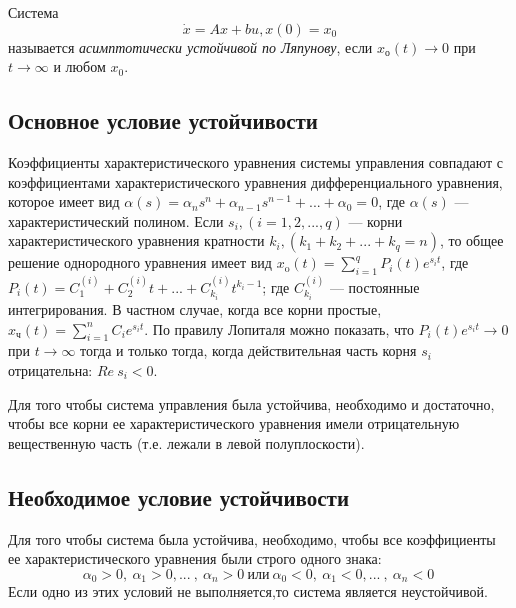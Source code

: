 \documentclass[../../TAU.tex]{subfiles}
\begin{document}
    Система 
    \begin{equation}\label{LIN_DS_3_1}
        \dot x = Ax + bu, x(0) = x_0
    \end{equation} 
    называется 
    {\it асимптотически устойчивой по Ляпунову}, если 
    $x_\text{о}(t)\rightarrow0$ 
    при 
    $t\rightarrow\infty$ 
    и любом $x_0$.\par

\subsection{Основное условие устойчивости}

    Коэффициенты характеристического уравнения системы управления совпадают с коэффициентами характеристического уравнения дифференциального уравнения, которое имеет вид
    $\alpha(s)=\alpha_ns^n+\alpha_{n-1}s^{n-1}+...+\alpha_0=0$, 
    где $\alpha(s)$ --- 
    характеристический полином. Если 
    $s_i, (i=1,2,...,q)$ ---
    корни характеристического уравнения кратности
    $k_i, (k_1+k_2+...+k_q=n)$, 
    то общее решение однородного уравнения имеет вид 
    $x_\text{o}(t)=\sum_{i=1}^q{P_i(t) e^{s_i t}}$, 
    где 
    $P_i(t)=C_1^{(i)}+C_2^{(i)} t+...+C_{k_i}^{(i)} t^{k_i-1}$; 
    где 
    $C_{k_i}^{(i)}$ --- постоянные   интегрирования. 
    В частном случае, когда все корни простые, 
    $x_\text{ч}(t)=\sum_{i=1}^nC_i e^{s_i t}$. 
    По правилу Лопиталя можно показать, что 
    $P_i(t) e^{s_i t}\rightarrow 0 $
    при 
    $t\rightarrow\infty$ 
    тогда и только тогда, когда действительная часть корня 
    $s_i$
    отрицательна: 
    $Re\ {s_i}<0$. 

     Для того чтобы система управления была устойчива, необходимо и достаточно, чтобы все корни ее характеристического уравнения имели отрицательную вещественную часть (т.е. лежали в левой полуплоскости). 

\subsection{Необходимое условие устойчивости}

    \cite[стр. 130]{voron} Для того чтобы система была устойчива, необходимо, чтобы все коэффициенты ее характеристического уравнения были строго одного знака: 
    $$
        \alpha_0>0,\ \alpha_1>0, ...\ ,\ \alpha_n>0\ \text{или}\ \alpha_0<0,\ \alpha_1<0, ...\ ,\ \alpha_n<0\ 
    $$
    Если одно из этих условий не выполняется,то система является неустойчивой.
\end{document}
